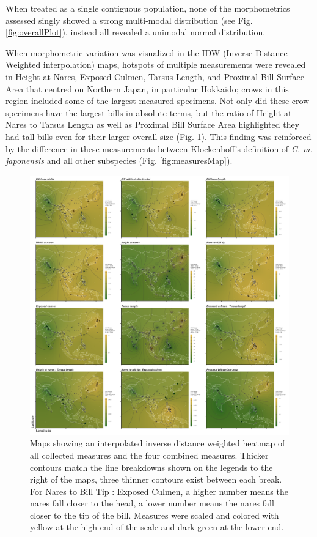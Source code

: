 \documentclass[10pt,a4paper]{article}
\begin{document}
When treated as a single contiguous population, none of the morphometrics assessed singly showed a strong multi-modal distribution (see Fig. \ref{fig:overallPlot}), instead all revealed a unimodal normal distribution.

When morphometric variation was visualized in the IDW (Inverse Distance Weighted interpolation) maps, hotspots of multiple measurements were revealed in Height at Nares, Exposed Culmen, Tarsus Length, and Proximal Bill Surface Area that centred on Northern Japan, in particular Hokkaido; crows in this region included some of the largest measured specimens.
Not only did these crow specimens have the largest bills in absolute terms, but the ratio of Height at Nares to Tarsus Length as well as Proximal Bill Surface Area highlighted they had tall bills even for their larger overall size (Fig. \ref{fig:idwMaps}).
This finding was reinforced by the difference in these measurements between Klockenhoff's definition of \emph{C. m. japonensis} and all other subspecies (Fig. \ref{fig:measuresMap}).

\begin{figure}
\includegraphics[width=0.9\linewidth]{../Figures/IDWmaps} \caption{Maps showing an interpolated inverse distance weighted heatmap of all collected measures and the four combined measures. Thicker contours match the line breakdowns shown on the legends to the right of the maps, three thinner contours exist between each break. For Nares to Bill Tip : Exposed Culmen, a higher number means the nares fall closer to the head, a lower number means the nares fall closer to the tip of the bill. Measures were scaled and colored with yellow at the high end of the scale and dark green at the lower end.}\label{fig:idwMaps}
\end{figure}
\end{document}

